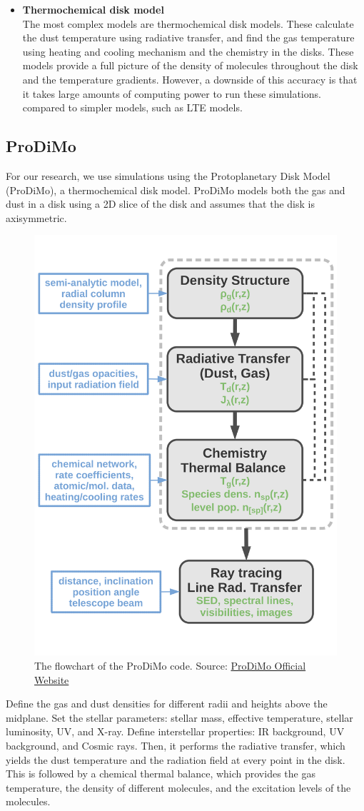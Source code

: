\documentclass[oneside, single, authoryear, semicolon, 12pt]{lion-msc}
\newcommand{\4}{$_4$}
\newcommand{\3}{$_3$}
\newcommand{\2}{$_2$}
\begin{document}
\begin{itemize}
    \item \textbf{Thermochemical disk model} \\
    The most complex models are thermochemical disk models. These calculate the dust temperature using radiative transfer, and find the gas temperature using heating and cooling mechanism and the chemistry in the disks. These models provide a full picture of the density of molecules throughout the disk and the temperature gradients. However, a downside of this accuracy is that it takes large amounts of computing power to run these simulations. compared to simpler models, such as LTE models. 
\end{itemize}

\subsection{ProDiMo}
For our research, we use simulations using the Protoplanetary Disk Model (ProDiMo), a thermochemical disk model. ProDiMo models both the gas and dust in a disk using a 2D slice of the disk and assumes that the disk is axisymmetric. 

\begin{figure}[H]
    \centering
    \includegraphics[width=0.5\linewidth]{Figures/prodimoflowchart (1).png}
    \caption{The flowchart of the ProDiMo code. Source: \href{https://prodimo.iwf.oeaw.ac.at/}{ProDiMo Official Website}}
    \label{fig:enter-label}
\end{figure}

Define the gas and dust densities for different radii and heights above the midplane. Set the stellar parameters: stellar mass, effective temperature, stellar luminosity, UV, and X-ray. Define interstellar properties: IR background, UV background, and Cosmic rays.  Then, it performs the radiative transfer, which yields the dust temperature and the radiation field at every point in the disk. This is followed by a chemical thermal balance, which provides the gas temperature, the density of different molecules, and the excitation levels of the molecules. 
\end{document}
